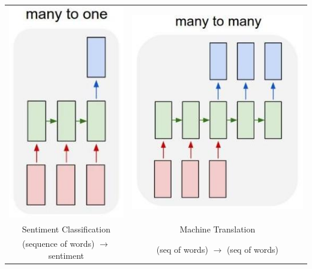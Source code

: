 \documentclass[fullscreen=true, bookmarks=true, hyperref={pdfencoding=unicode}]{beamer}
\begin{document}
\begin{frame}
  \begin{tabular}{cc}
    \includegraphics[keepaspectratio,
                     width=0.25\paperwidth]{many-to-one.jpg} &
    \includegraphics[keepaspectratio,
                     width=0.4\paperwidth]{many-to-many.jpg} \\
    Sentiment Classification & Machine Translation \\
     (sequence of words) $\to$ sentiment & (seq of words) $\to$ (seq of words)
  \end{tabular}
\end{frame}
\end{document}
